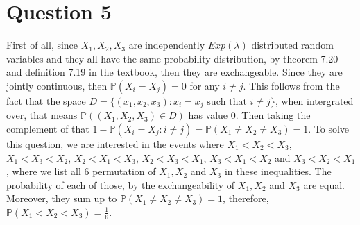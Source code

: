 \documentclass[a4paper,11pt]{article}
\newcommand{\prob}{\mathbb{P}}
\newcommand{\Prob}{\prob}
\begin{document}
\section*{Question 5}
First of all, since $X_1,X_2,X_3$ are independently $Exp(\lambda)$ distributed random variables and they all have the same probability distribution, by theorem 7.20 and definition 7.19 in the textbook, then they are exchangeable. Since they are jointly continuous, then $\Prob(X_i = X_j) = 0$ for any $i \neq j$. This follows from the fact that the space $D = \{(x_1,x_2,x_3) \colon x_i = x_j \text{ such that $i \neq j$} \}$, when intergrated over, that means $\Prob((X_1,X_2,X_3) \in D)$ has value $0$.  Then taking the complement of that $1 - \Prob(X_i = X_j \colon i \neq j) = \Prob(X_1 \neq X_2 \neq X_3) = 1$. To solve this question, we are interested in the events where $X_1 < X_2 < X_3$, $X_1 < X_3 < X_2$, $X_2 < X_1 < X_3$, $X_2 < X_3 < X_1$, $X_3 < X_1 < X_2$ and $X_3 < X_2 < X_1$, where we list all $6$ permutation of $X_1, X_2$ and $X_3$ in these inequalities. The probability of each of those, by the exchangeability of $X_1, X_2$ and $X_3$ are equal. Moreover, they sum up to $\Prob(X_1 \neq X_2 \neq X_3) = 1$, therefore, $\Prob(X_1 < X_2 < X_3) = \frac{1}{6}$. 
\end{document}
